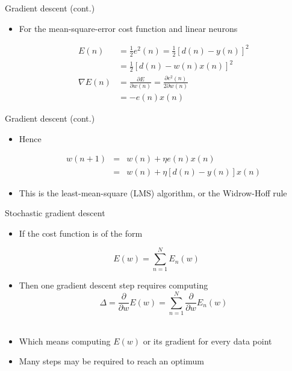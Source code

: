 \documentclass[notes]{beamer}
\providecommand{\tightlist}{%
  \setlength{\itemsep}{0pt}\setlength{\parskip}{0pt}}
\begin{document}
\begin{frame}{Gradient descent (cont.)}

\begin{itemize}
\tightlist
\item
  For the mean-square-error cost function and linear neurons

  \begin{equation*}
  \begin{aligned}
      E ( n ) & = \frac{1}{2} e^2 ( n ) = \frac{1}{2} [d ( n ) − y ( n )]^2  \\
      &= \frac{1}{2} [d ( n ) − w( n ) x ( n )]^2  \\
      \nabla E(n) &= \frac{\partial E}{\partial w(n)  }  = \frac{\partial e^2 (n)}{2 \partial w(n) } \\
      &= -e(n)x(n) 
  \end{aligned}
  \end{equation*}
\end{itemize}

\end{frame}

\begin{frame}{Gradient descent (cont.)}

\begin{itemize}
\tightlist
\item
  Hence

  \begin{eqnarray*}
  w( n + 1) &=& w( n ) +\eta  e( n ) x ( n ) \\ 
             &     =& w( n ) +\eta  [d ( n ) -  y ( n )] x ( n )
  \end{eqnarray*}
\item
  This is the least-mean-square (LMS) algorithm, or the Widrow-Hoff rule
\end{itemize}

\end{frame}

\begin{frame}{Stochastic gradient descent}

\begin{itemize}
\tightlist
\item
  If the cost function is of the form
\end{itemize}

\[E(w)=\sum_{n=1}^{N}E_n(w) \]

\begin{itemize}
\tightlist
\item
  Then one gradient descent step requires computing
  \[\Delta = \frac{\partial}{\partial w} E(w) =\sum_{n=1}^{N} \frac{\partial}{\partial w}E_n(w) \]\\
\item
  Which means computing \(E(w)\) or its gradient for every data point
\item
  Many steps may be required to reach an optimum
\end{itemize}

\end{frame}
\end{document}
